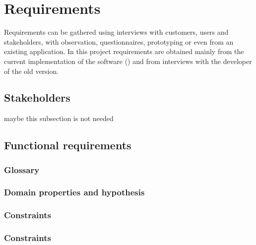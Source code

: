 \chapter{Requirements}
Requirements can be gathered using interviews with customers, users and stakeholders, with observation, questionnaires, prototyping or even from an existing application.
In this project requirements are obtained mainly from the current implementation of the software () and from interviews with the developer of the old version.

\section{Stakeholders}
maybe this subsection is not needed

\section{Functional requirements}

\subsection{Glossary}
\subsection{Domain properties and hypothesis}
\subsection{Constraints}
\subsection{Constraints}
